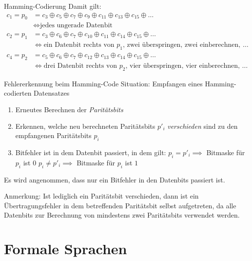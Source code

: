 \documentclass[german]{spicker}
\begin{document}
\begin{defi}{Hamming-Codierung}
    Damit gilt:
    $$
        \begin{aligned}
            c_1 = p_0 & = c_3 \oplus c_5 \oplus c_7 \oplus c_9 \oplus c_{11} \oplus c_{13} \oplus c_{15} \oplus \ldots    \\
                      & \iff \text{jedes ungerade Datenbit}                                                               \\
            c_2 = p_1 & = c_3 \oplus c_6 \oplus c_7 \oplus c_{10} \oplus c_{11} \oplus c_{14} \oplus c_{15} \oplus \ldots \\
                      & \iff \text{ein Datenbit rechts von $p_1$, zwei überspringen, zwei einberechnen, $\ldots$}         \\
            c_4 = p_2 & = c_5 \oplus c_6 \oplus c_7 \oplus c_{12} \oplus c_{13} \oplus c_{14} \oplus c_{15} \oplus \ldots \\
                      & \iff \text{drei Datenbit rechts von $p_2$, vier überspringen, vier einberechnen, $\ldots$}
        \end{aligned}
    $$
\end{defi}

\begin{algo}{Fehlererkennung beim Hamming-Code}
    Situation: Empfangen eines Hamming-codierten Datensatzes

    \begin{enumerate}
        \item Erneutes Berechnen der \emph{Paritätsbits}
        \item Erkennen, welche neu berechneten Paritätsbits $p'_i$ \emph{verschieden} sind zu den empfangenen Paritätsbits $p_i$
        \item Bitfehler ist in dem Datenbit passiert, in dem gilt:
              \subitem $p_i = p'_i \implies$ Bitmaske für $p_i$ ist $0$
              \subitem $p_i \neq p'_i \implies$ Bitmaske für $p_i$ ist $1$
    \end{enumerate}

    Es wird angenommen, dass nur ein Bitfehler in den Datenbits passiert ist.

    Anmerkung: Ist lediglich ein Paritätsbit verschieden, dann ist ein Übertragungsfehler in dem betreffenden Paritätsbit selbst aufgetreten, da alle Datenbits zur Berechnung von mindestens zwei Paritätsbits verwendet werden.
\end{algo}

\section{Formale Sprachen}
\end{document}
